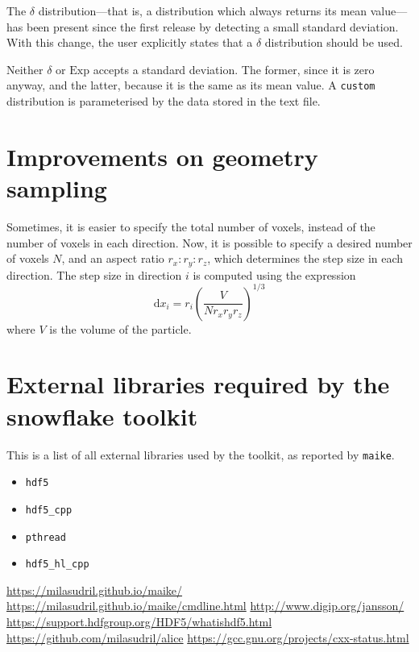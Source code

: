 \documentclass[a4paper,10pt]{scrartcl}
\newcommand{\prgname}[1]{\texttt{#1}}
\newcommand{\dd}{\mathrm{d}}
\begin{document}
The $\delta$ distribution---that is, a distribution which always returns its mean value---has been present since the first release by detecting a small standard deviation. With this change, the user explicitly states that a $\delta$ distribution should be used.

Neither $\delta$ or $\text{Exp}$ accepts a standard deviation. The former, since it is zero anyway, and the latter, because it is the same as its mean value. A \texttt{custom} distribution is parameterised by the data stored in the text file.


\section{Improvements on geometry sampling}
Sometimes, it is easier to specify the total number of voxels, instead of the number of voxels in each direction. Now, it is possible to specify a desired number of voxels $N$, and an aspect ratio $r_x:r_y:r_z$, which determines the step size in each direction. The step size in direction $i$ is computed using the expression
\[
 \dd x_i = r_i \left(\frac{V}{N r_x r_y r_z}\right)^{1/3}
\]
where $V$ is the volume of the particle.

\appendix

\section{External libraries required by the snowflake toolkit}
\label{deps}
This is a list of all external libraries used by the toolkit, as reported by \prgname{maike}.

\begin{itemize}
 \item \texttt{hdf5}
 \item \texttt{hdf5\_cpp}
 \item \texttt{pthread}
 \item \texttt{hdf5\_hl\_cpp}
 \end{itemize}
 

\begin{thebibliography}{9}
 \url{https://milasudril.github.io/maike/}
 \url{https://milasudril.github.io/maike/cmdline.html}
 \url{http://www.digip.org/jansson/}
 \url{https://support.hdfgroup.org/HDF5/whatishdf5.html}
 \url{https://github.com/milasudril/alice}
 \url{https://gcc.gnu.org/projects/cxx-status.html}
\end{thebibliography}
\end{document}
